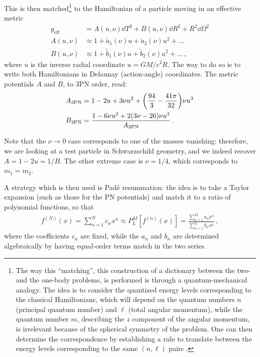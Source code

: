 \documentclass[main.tex]{subfiles}
\begin{document}
This is then matched\footnote{The way this ``matching'', this construction of a dictionary between the two- and the one-body problems, is performed is through a quantum-mechanical analogy. The idea is to consider the quantized energy levels corresponding to the classical Hamiltonians, which will depend on the quantum numbers \(n\) (principal quantum number) and \(\ell\) (total angular momentum),  while the quantum number \(m\), describing  the \(z\) component of the angular momentum, is irrelevant because of the spherical symmetry of the problem. One can then determine the correspondence by establishing a rule to translate between the energy levels corresponding to the same \((n, \ell)\) pairs \cite{damourGeneralRelativisticTwo2014}.} to the Hamiltonian of a particle moving in an effective metric 
%
\begin{subequations}
\begin{align}
g _{\text{eff}} &= A(u, \nu ) \dd{T^2} + B(u, \nu) \dd{R^2} + R^2 \dd{\Omega^2}  \\
A(u, \nu ) &\approx 1 + \widetilde{a}_1 (\nu ) u + \widetilde{a}_2 (\nu ) u^2 + \dots  \\
B(u, \nu ) &\approx 1 + \widetilde{b}_1 (\nu ) u + \widetilde{b}_2 (\nu ) u^2 + \dots  
\,,
\end{align}
\end{subequations}
%
where \(u\) is the inverse radial coordinate \(u = GM / c^2 R\). 
The way to do so is to write both Hamiltonians in Delaunay (action-angle) coordinates. 
The metric potentials \(A\) and \(B\), to 3PN order, read: 
%
\begin{subequations}
\begin{align}
A _{\text{3PN}} &= 1 - 2u + 3 \nu u^2 + \qty( \frac{94}{3} - \frac{41 \pi }{32}) \nu u^3  \\
B _{\text{3PN}} &= \frac{1 - 6 \nu u^2 + 2 (3 \nu - 26) \nu u^3}{A _{\text{3PN}}}
\,.
\end{align}
\end{subequations}

Note that the \(\nu \to 0\) case corresponds to one of the masses vanishing: therefore, we are looking at a test particle in Schwarzschild geometry, and we indeed recover \(A = 1-2u = 1/B\).
The other extreme case is \(\nu = 1/4\), which corresponds to \(m_1 = m_2 \). 

A strategy which is then used is Padé resummation: 
the idea is to take a Taylor expansion (such as those for the \ac{PN} potentials) and match it to 
a ratio of polynomial functions, so that 
%
\begin{align}
f^{(N)}(x) = \sum _{n=1}^{N} c_n x^{n} \approx P_{L}^{M}[f^{(n)}(x)] = \frac{\sum _{n=1}^{M} a_n x^{n}}{\sum _{n=1}^{L} b_n x^{n}}
\,,
\end{align}
%
where the coefficients \(c_n\) are fixed, while the \(a_n\) and \(b_n\) are determined algebraically 
by having equal-order terms match in the two series. 
\end{document}
